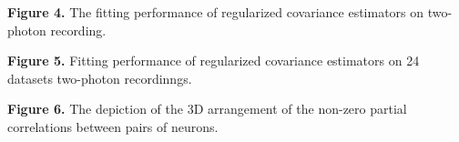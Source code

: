 \textbf{Figure 4.}{ 
The fitting performance of regularized covariance estimators on two-photon recording. 
}\label{fig:04}

\textbf{Figure 5.}{ 
Fitting performance of regularized covariance estimators on 24 datasets two-photon recordinngs.
}\label{fig:05}

\textbf{Figure 6.}{
The depiction of the 3D arrangement of the non-zero partial correlations between pairs of neurons.
}\label{fig:06}

